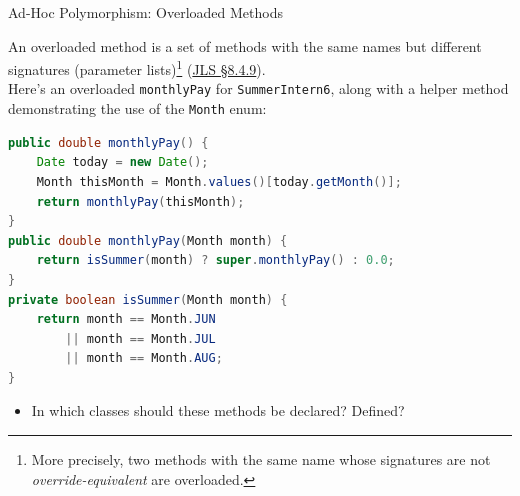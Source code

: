 \documentclass{beamer}
\begin{document}
\begin{frame}[fragile]{Ad-Hoc Polymorphism: Overloaded Methods}


An overloaded method is a set of methods with the same names but different signatures (parameter lists)\footnote{More precisely, two methods with the same name whose signatures are not {\it override-equivalent} are overloaded.} (\href{http://docs.oracle.com/javase/specs/jls/se7/html/jls-8.html#jls-8.4.9}{JLS \S 8.4.9}).\\
\vspace{.075in}
Here's an overloaded {\tt monthlyPay} for {\tt SummerIntern6}, along with a helper method demonstrating the use of the {\tt Month} enum:
\begin{lstlisting}[language=Java]
public double monthlyPay() {
    Date today = new Date();
    Month thisMonth = Month.values()[today.getMonth()];
    return monthlyPay(thisMonth);
}
public double monthlyPay(Month month) {
    return isSummer(month) ? super.monthlyPay() : 0.0;
}
private boolean isSummer(Month month) {
    return month == Month.JUN
        || month == Month.JUL
        || month == Month.AUG;
}
\end{lstlisting}
\vspace{-.075in}
\begin{itemize}
\item In which classes should these methods be declared? Defined?
\end{itemize}


\end{frame}
\end{document}
